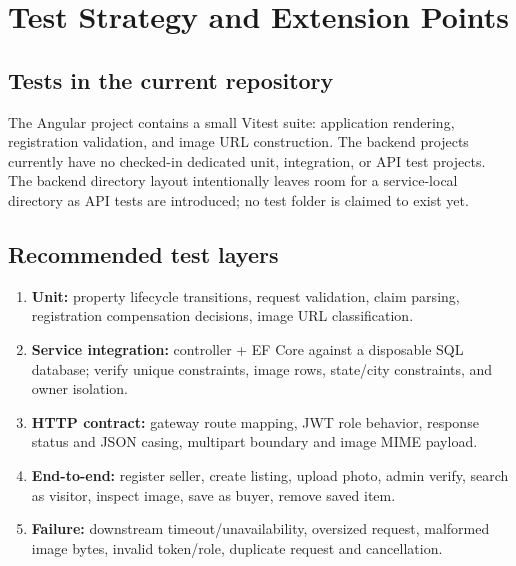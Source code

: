 \documentclass[10pt,a4paper]{article}
\newcommand{\code}[1]{\texttt{\detokenize{#1}}}
\begin{document}
\section{Test Strategy and Extension Points}
\subsection{Tests in the current repository}
The Angular project contains a small Vitest suite: application rendering,
registration validation, and image URL construction. The backend projects currently
have no checked-in dedicated unit, integration, or API test projects. The backend
directory layout intentionally leaves room for a service-local \code{tests/}
directory as API tests are introduced; no test folder is claimed to exist yet.

\subsection{Recommended test layers}
\begin{enumerate}
  \item \textbf{Unit:} property lifecycle transitions, request validation, claim parsing,
  registration compensation decisions, image URL classification.
  \item \textbf{Service integration:} controller + EF Core against a disposable SQL
  database; verify unique constraints, image rows, state/city constraints, and owner
  isolation.
  \item \textbf{HTTP contract:} gateway route mapping, JWT role behavior, response
  status and JSON casing, multipart boundary and image MIME payload.
  \item \textbf{End-to-end:} register seller, create listing, upload photo, admin
  verify, search as visitor, inspect image, save as buyer, remove saved item.
  \item \textbf{Failure:} downstream timeout/unavailability, oversized request,
  malformed image bytes, invalid token/role, duplicate request and cancellation.
\end{enumerate}
\end{document}
